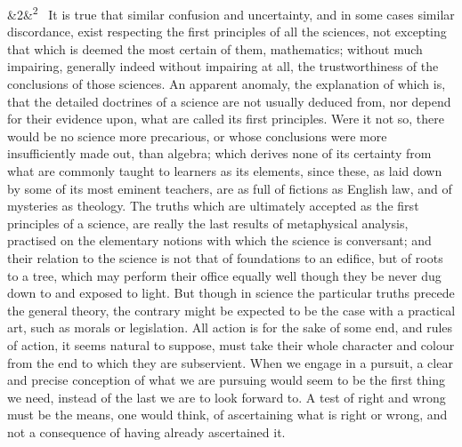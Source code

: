 \documentclass[12pt]{article}
\newcommand{\para}[1][]{\par\noindent\ifx&#1&\else\textsuperscript{\footnotesize #1}~\fi}
\begin{document}
\para[2] It is true that similar confusion and uncertainty, and in some cases similar discordance, exist respecting the first principles of all the sciences, not excepting that which is deemed the most certain of them, mathematics; without much impairing, generally indeed without impairing at all, the trustworthiness of the conclusions of those sciences. An apparent anomaly, the explanation of which is, that the detailed doctrines of a science are not usually deduced from, nor depend for their evidence upon, what are called its first principles. Were it not so, there would be no science more precarious, or whose conclusions were more insufficiently made out, than algebra; which derives none of its certainty from what are commonly taught to learners as its elements, since these, as laid down by some of its most eminent teachers, are as full of fictions as English law, and of mysteries as theology. The truths which are ultimately accepted as the first principles of a science, are really the last results of metaphysical analysis, practised on the elementary notions with which the science is conversant; and their relation to the science is not that of foundations to an edifice, but of roots to a tree, which may perform their office equally well though they be never dug down to and exposed to light. But though in science the particular truths precede the general theory, the contrary might be expected to be the case with a practical art, such as morals or legislation. All action is for the sake of some end, and rules of action, it seems natural to suppose, must take their whole character and colour from the end to which they are subservient. When we engage in a pursuit, a clear and precise conception of what we are pursuing would seem to be the first thing we need, instead of the last we are to look forward to. A test of right and wrong must be the means, one would think, of ascertaining what is right or wrong, and not a consequence of having already ascertained it.
\end{document}
